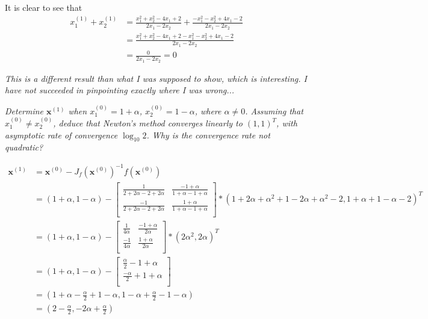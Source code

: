 It is clear to see that
\begin{align*}
    x_1^{(1)} + x_2^{(1)} &= \frac{x_1^2 + x_2^2 - 4x_1  + 2}{2x_1 - 2x_2} + \frac{-x_1^2 - x_2^2 + 4x_1  - 2}{2x_1 - 2x_2} \\
    &= \frac{x_1^2 + x_2^2 - 4x_1  + 2 - x_1^2 - x_2^2 + 4x_1  - 2}{2x_1 - 2x_2} \\
    &= \frac{0}{2x_1 - 2x_2} = 0
\end{align*}

\textit{This is a different result than what I was supposed to show, which is interesting. I have not succeeded in pinpointing exactly where I was wrong...}


\textit{Determine $\mathbf{x}^{(1)}$ when $x_1^{(0)} = 1 + \alpha$, $x_2^{(0)} = 1 - \alpha$, where $\alpha \ne 0$. Assuming that $x_1^{(0)} \ne x_2^{(0)}$, deduce that Newton's method converges linearly to $(1, 1)^T$, with asymptotic rate of convergence $\log_{10}2$. Why is the convergence rate not quadratic?}

\begin{align*}
    \mathbf{x}^{(1)} &= \mathbf{x}^{(0)} - J_f(\mathbf{x}^{(0)})^{-1} f(\mathbf{x}^{(0)}) \\
    &= (1 + \alpha, 1 - \alpha) - \begin{bmatrix}
        \frac{1}{2 + 2\alpha - 2 + 2\alpha} & \frac{-1 + \alpha}{1 + \alpha - 1 + \alpha} \\
        \frac{-1}{2 + 2\alpha - 2 + 2\alpha} & \frac{1 + \alpha}{1 + \alpha - 1 + \alpha} \\
    \end{bmatrix} * (1 + 2\alpha + \alpha^2 + 1 - 2\alpha + \alpha^2 - 2, 1 + \alpha + 1 - \alpha - 2)^T \\
    &= (1 + \alpha, 1 - \alpha) - \begin{bmatrix}
        \frac{1}{4\alpha} & \frac{-1 + \alpha}{2\alpha} \\
        \frac{-1}{4\alpha} & \frac{1 + \alpha}{2\alpha} \\
    \end{bmatrix} * (2\alpha^2, 2\alpha)^T \\
    &= (1 + \alpha, 1 - \alpha) - \begin{bmatrix}
        \frac{\alpha}{2} -1 + \alpha \\
        \frac{-\alpha}{2} + 1 + \alpha \\
    \end{bmatrix} \\
    &= (1 + \alpha - \frac{\alpha}{2} + 1 - \alpha, 1 - \alpha + \frac{\alpha}{2} - 1 - \alpha) \\
    &= (2 - \frac{\alpha}{2}, - 2\alpha + \frac{\alpha}{2}) \\
\end{align*}

